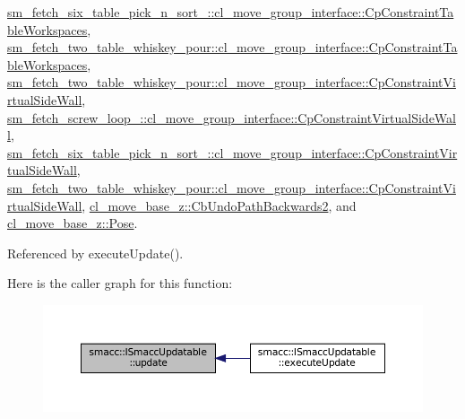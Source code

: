 \hyperlink{classsm__fetch__six__table__pick__n__sort__1_1_1cl__move__group__interface_1_1CpConstraintTableWorkspaces_ac938a2faf9dc7e9cc1f24bac150f189f}{sm\+\_\+fetch\+\_\+six\+\_\+table\+\_\+pick\+\_\+n\+\_\+sort\+\_\+::cl\+\_\+move\+\_\+group\+\_\+interface\+::\+Cp\+Constraint\+Table\+Workspaces}, \hyperlink{classsm__fetch__two__table__whiskey__pour_1_1cl__move__group__interface_1_1CpConstraintTableWorkspaces_a7c8e7186aff561f2a1721145814add82}{sm\+\_\+fetch\+\_\+two\+\_\+table\+\_\+whiskey\+\_\+pour\+::cl\+\_\+move\+\_\+group\+\_\+interface\+::\+Cp\+Constraint\+Table\+Workspaces}, \hyperlink{classsm__fetch__two__table__whiskey__pour_1_1cl__move__group__interface_1_1CpConstraintVirtualSideWall_a0d810890cc65189012a33af233d18c9f}{sm\+\_\+fetch\+\_\+two\+\_\+table\+\_\+whiskey\+\_\+pour\+::cl\+\_\+move\+\_\+group\+\_\+interface\+::\+Cp\+Constraint\+Virtual\+Side\+Wall}, \hyperlink{classsm__fetch__screw__loop__1_1_1cl__move__group__interface_1_1CpConstraintVirtualSideWall_a86d9dd2c82600e9b175ee0e456c797a8}{sm\+\_\+fetch\+\_\+screw\+\_\+loop\+\_\+::cl\+\_\+move\+\_\+group\+\_\+interface\+::\+Cp\+Constraint\+Virtual\+Side\+Wall}, \hyperlink{classsm__fetch__six__table__pick__n__sort__1_1_1cl__move__group__interface_1_1CpConstraintVirtualSideWall_a7631ce0dba22a59484ad96eb0f5482d5}{sm\+\_\+fetch\+\_\+six\+\_\+table\+\_\+pick\+\_\+n\+\_\+sort\+\_\+::cl\+\_\+move\+\_\+group\+\_\+interface\+::\+Cp\+Constraint\+Virtual\+Side\+Wall}, \hyperlink{classsm__fetch__two__table__whiskey__pour_1_1cl__move__group__interface_1_1CpConstraintVirtualSideWall_a2295eef9dd270ab1e9d2b0837f103352}{sm\+\_\+fetch\+\_\+two\+\_\+table\+\_\+whiskey\+\_\+pour\+::cl\+\_\+move\+\_\+group\+\_\+interface\+::\+Cp\+Constraint\+Virtual\+Side\+Wall}, \hyperlink{classcl__move__base__z_1_1CbUndoPathBackwards2_a62f0d53fc341ca6d241637cc0e4b2e30}{cl\+\_\+move\+\_\+base\+\_\+z\+::\+Cb\+Undo\+Path\+Backwards2}, and \hyperlink{classcl__move__base__z_1_1Pose_abf99d1127cf51a93f97ada2031196114}{cl\+\_\+move\+\_\+base\+\_\+z\+::\+Pose}.



Referenced by execute\+Update().

Here is the caller graph for this function\+:
\nopagebreak
\begin{figure}[H]
\begin{center}
\leavevmode
\includegraphics[width=350pt]{classsmacc_1_1ISmaccUpdatable_a84ee0520cbefdb1d412bed54650b028e_icgraph}
\end{center}
\end{figure}


